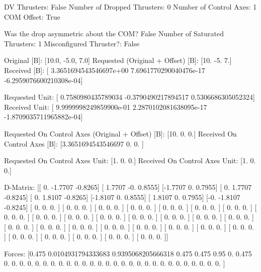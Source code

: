 DV Thrusters:	False
Number of Dropped Thrusters:	0
Number of Control Axes:	1
COM Offset:	True

Was the drop asymmetric about the COM?	False
Number of Saturated Thrusters:	1
Misconfigured Thruster?:	False

Original [B]:	[10.0, -5.0, 7.0]
Requested (Original + Offset) [B]:	[10. -5.  7.]
Received [B]:		[ 3.3651694543546697e+00  7.6961770290040476e-17 -6.2959076600210308e-04]

Requested Unit:		[ 0.7580980435789034 -0.3790490217894517  0.5306686305052324]
Received Unit:		[ 9.9999998249859900e-01  2.2870102081638095e-17 -1.8709035711965882e-04]

Requested On Control Axes (Original + Offset) [B]:	[10.  0.  0.]
Received On Control Axes [B]:		[3.3651694543546697 0.                 0.                ]

Requested On Control Axes Unit:		[1. 0. 0.]
Received On Control Axes Unit:		[1. 0. 0.]

D-Matrix:
[[ 0.     -1.7707 -0.8265]
 [ 1.7707 -0.      0.8555]
 [-1.7707  0.      0.7955]
 [ 0.      1.7707 -0.8245]
 [ 0.      1.8107 -0.8265]
 [-1.8107  0.      0.8555]
 [ 1.8107  0.      0.7955]
 [-0.     -1.8107 -0.8245]
 [ 0.      0.      0.    ]
 [ 0.      0.      0.    ]
 [ 0.      0.      0.    ]
 [ 0.      0.      0.    ]
 [ 0.      0.      0.    ]
 [ 0.      0.      0.    ]
 [ 0.      0.      0.    ]
 [ 0.      0.      0.    ]
 [ 0.      0.      0.    ]
 [ 0.      0.      0.    ]
 [ 0.      0.      0.    ]
 [ 0.      0.      0.    ]
 [ 0.      0.      0.    ]
 [ 0.      0.      0.    ]
 [ 0.      0.      0.    ]
 [ 0.      0.      0.    ]
 [ 0.      0.      0.    ]
 [ 0.      0.      0.    ]
 [ 0.      0.      0.    ]
 [ 0.      0.      0.    ]
 [ 0.      0.      0.    ]
 [ 0.      0.      0.    ]
 [ 0.      0.      0.    ]
 [ 0.      0.      0.    ]
 [ 0.      0.      0.    ]
 [ 0.      0.      0.    ]
 [ 0.      0.      0.    ]
 [ 0.      0.      0.    ]]

Forces:
[0.475              0.0104931794333683 0.9395068205666318
 0.475              0.475              0.95
 0.                 0.475              0.
 0.                 0.                 0.
 0.                 0.                 0.
 0.                 0.                 0.
 0.                 0.                 0.
 0.                 0.                 0.
 0.                 0.                 0.
 0.                 0.                 0.
 0.                 0.                 0.
 0.                 0.                 0.                ]

